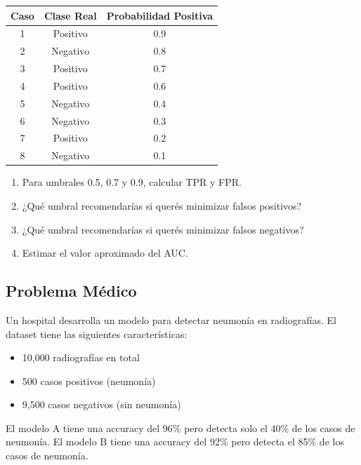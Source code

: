 \documentclass[12pt]{article}
\begin{document}
\begin{table}[H]
    \centering
    \begin{tabular}{|c|c|c|}
        \hline
        \textbf{Caso} & \textbf{Clase Real} & \textbf{Probabilidad Positiva} \\
        \hline
        1 & Positivo & 0.9 \\
        \hline
        2 & Negativo & 0.8 \\
        \hline
        3 & Positivo & 0.7 \\
        \hline
        4 & Positivo & 0.6 \\
        \hline
        5 & Negativo & 0.4 \\
        \hline
        6 & Negativo & 0.3 \\
        \hline
        7 & Positivo & 0.2 \\
        \hline
        8 & Negativo & 0.1 \\
        \hline
    \end{tabular}
\end{table}

\begin{enumerate}
    \item[a.] Para umbrales 0.5, 0.7 y 0.9, calcular TPR y FPR.
    \item[b.] ¿Qué umbral recomendarías si querés minimizar falsos positivos?
    \item[c.] ¿Qué umbral recomendarías si querés minimizar falsos negativos?
    \item[d.] Estimar el valor aproximado del AUC.
\end{enumerate}

\subsection{Problema Médico}

Un hospital desarrolla un modelo para detectar neumonía en radiografías. El dataset tiene las siguientes características:
\begin{itemize}
    \item 10,000 radiografías en total
    \item 500 casos positivos (neumonía)
    \item 9,500 casos negativos (sin neumonía)
\end{itemize}

El modelo A tiene una accuracy del 96\% pero detecta solo el 40\% de los casos de neumonía.
El modelo B tiene una accuracy del 92\% pero detecta el 85\% de los casos de neumonía.
\end{document}
